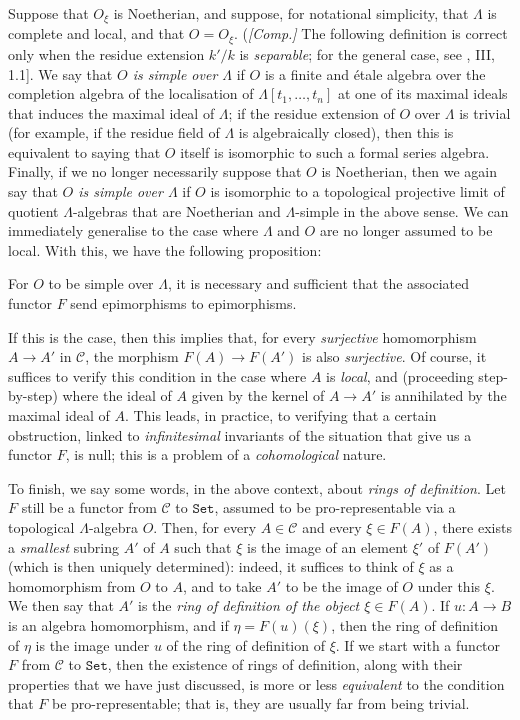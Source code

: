Suppose that $O_\xi$ is Noetherian, and suppose, for notational simplicity, that $\Lambda$ is complete and local, and that $O=O_\xi$.
(\emph{[Comp.]} The following definition is correct only when the residue extension $k'/k$ is \emph{separable}; for the general case, see \cite{Gro1960b}, III, 1.1].
We say that \emph{$O$ is simple over $\Lambda$} if $O$ is a finite and étale algebra over the completion algebra of the localisation of $\Lambda[t_1,\ldots,t_n]$ at one of its maximal ideals that induces the maximal ideal of $\Lambda$;
if the residue extension of $O$ over $\Lambda$ is trivial (for example, if the residue field of $\Lambda$ is algebraically closed), then this is equivalent to saying that $O$ itself is isomorphic to such a formal series algebra.
Finally, if we no longer necessarily suppose that $O$ is Noetherian, then we again say that \emph{$O$ is simple over $\Lambda$} if $O$ is isomorphic to a topological projective limit of quotient $\Lambda$-algebras that are Noetherian and $\Lambda$-simple in the above sense.
We can immediately generalise to the case where $\Lambda$ and $O$ are no longer assumed to be local.
With this, we have the following proposition:


\begin{proposition}\label{fga3.ii-a.5-proposition-5.2}
    For $O$ to be simple over $\Lambda$, it is necessary and sufficient that the associated functor $F$ send epimorphisms to epimorphisms.
\end{proposition}


If this is the case, then this implies that, for every \emph{surjective} homomorphism $A\to A'$ in $\mathcal{C}$, the morphism $F(A)\to F(A')$ is also \emph{surjective}.
Of course, it suffices to verify this condition in the case where $A$ is \emph{local}, and (proceeding step-by-step) where the ideal of $A$ given by the kernel of $A\to A'$ is annihilated by the maximal ideal of $A$.
This leads, in practice, to verifying that a certain obstruction, linked to \emph{infinitesimal} invariants of the situation that give us a functor $F$, is null;
this is a problem of a \emph{cohomological} nature.


To finish, we say some words, in the above context, about \emph{rings of definition}.
Let $F$ still be a functor from $\mathcal{C}$ to $\mathtt{Set}$, assumed to be pro-representable via a topological $\Lambda$-algebra $O$.
Then, for every $A\in\mathcal{C}$ and every $\xi\in F(A)$, there exists a \emph{smallest} subring $A'$ of $A$ such that $\xi$ is the image of an element $\xi'$ of $F(A')$ (which is then uniquely determined):
indeed, it suffices to think of $\xi$ as a homomorphism from $O$ to $A$, and to take $A'$ to be the image of $O$ under this $\xi$.
We then say that $A'$ is the \emph{ring of definition of the object $\xi\in F(A)$}.
If $u\colon A\to B$ is an algebra homomorphism, and if $\eta=F(u)(\xi)$, then the ring of definition of $\eta$ is the image under $u$ of the ring of definition of $\xi$.
If we start with a functor $F$ from $\mathcal{C}$ to $\mathtt{Set}$, then the existence of rings of definition, along with their properties that we have just discussed, is more or less \emph{equivalent} to the condition that $F$ be pro-representable;
that is, they are usually far from being trivial.
